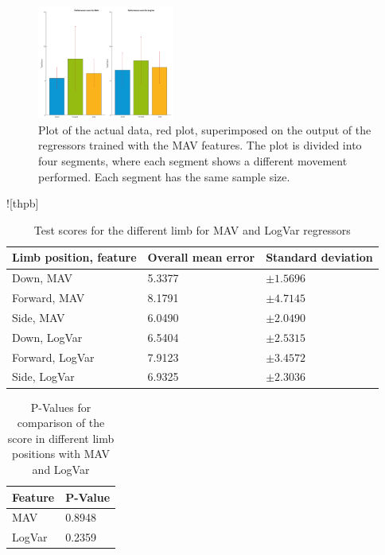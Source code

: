 	\begin{figure}[!thpb]
		\centering
		\includegraphics[width=0.4\textwidth]{figures/GotItTime}  %
		\caption{Plot of the actual data, red plot, superimposed on the output of the regressors trained with the MAV features. The plot is divided into four segments, where each segment shows a different movement performed. Each segment has the same sample size.}
		\label{fig:GotItTime}  %
	\end{figure}
	
	\begin{table}![thpb]
		\begin{center}
			\begin{tabular}{l l l}
				\hline
				\textbf{Limb position, feature} & \textbf{Overall mean error} & \textbf{Standard deviation}\\
				\hline
				Down, MAV & 5.3377 & $\pm 1.5696$ \\
				Forward, MAV & 8.1791 & $\pm 4.7145$ \\
				Side, MAV & 6.0490 & $\pm 2.0490$ \\
				Down, LogVar & 6.5404 & $\pm 2.5315$ \\
				Forward, LogVar & 7.9123 & $\pm 3.4572$ \\
				Side, LogVar & 6.9325 & $\pm 2.3036$ \\
				\hline
			\end{tabular}
			\caption{Test scores for the different limb for MAV and LogVar regressors}
		\end{center}
	\end{table}
	\begin{table}[!thpb]
		\begin{center}
			\begin{tabular}{l l}
				\hline
				\textbf{Feature} & \textbf{P-Value}\\
				\hline
				MAV & 0.8948 \\
				LogVar & 0.2359 \\
				\hline
			\end{tabular}
			\caption{P-Values for comparison of the score in different limb positions with MAV and LogVar}
		\end{center}
	\end{table}
	
